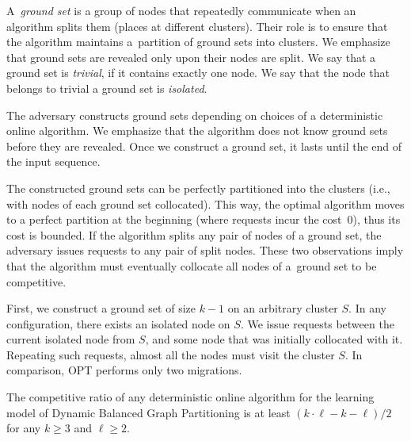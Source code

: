 \documentclass[a4paper,anonymous,USenglish]{lipics-v2019}
\newcommand{\OPT}{\textsf{OPT}\xspace}
\begin{document}
A~\emph{ground set} is a group of nodes that repeatedly communicate when an algorithm splits them (places at different clusters).
Their role is to ensure that the algorithm maintains a~partition of ground sets into clusters.
We emphasize that ground sets are revealed only upon their nodes are split.
We say that a ground set is \emph{trivial}, if it contains exactly one node.
We say that the node that belongs to trivial a ground set is \emph{isolated}.


The adversary constructs ground sets depending on choices of a deterministic online algorithm.
We emphasize that the algorithm does not know ground sets before they are revealed.
Once we construct a ground set, it lasts until the end of the input sequence.

The constructed ground sets can be perfectly partitioned into the clusters (i.e., with nodes of each ground set collocated).
This way, the optimal algorithm moves to a perfect partition at the beginning (where requests incur the cost~$0$), thus its cost is bounded.
If the algorithm splits any pair of nodes of a ground set, the adversary issues requests to any pair of split nodes.
These two observations imply that the algorithm must eventually collocate all nodes of a~ground set to be competitive.

First, we construct a ground set of size $k-1$ on an arbitrary cluster $S$.
In any configuration, there exists an isolated node on $S$.
We issue requests between the current isolated node from $S$, and some node that was initially collocated with it.
Repeating such requests, almost all the nodes must visit the cluster $S$.
In comparison, \OPT performs only two migrations.

\begin{theorem}
	\label{th:lowerbound}
	The competitive ratio of any deterministic online algorithm for the learning model of Dynamic Balanced Graph Partitioning is at least $(k\cdot \ell - k - \ell)/2$ for any $k\geq 3$ and $\ell \geq 2$.
\end{theorem}
\end{document}
